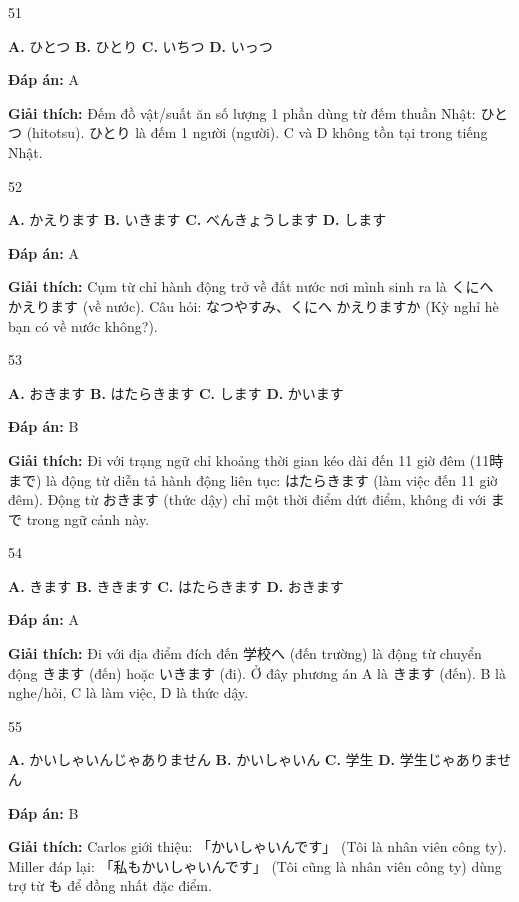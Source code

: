 \documentclass[12pt,a4paper]{report}
\newcommand{\source}[1]{}
\newcommand{\choice}[2]{\textbf{#1.} #2 \quad}
\newcommand{\answer}[1]{\par\textbf{Đáp án:} #1}
\newcommand{\confidence}[1]{}
\newcommand{\explain}[1]{\par\textbf{Giải thích:} #1\vspace{0.5cm}}
\begin{document}
\begin{question}{51}
\source{Q23.webp}
\choice{A}{ひとつ}
\choice{B}{ひとり}
\choice{C}{いちつ}
\choice{D}{いっつ}
\answer{A}
\confidence{high}
\explain{Đếm đồ vật/suất ăn số lượng 1 phần dùng từ đếm thuần Nhật: ひとつ (hitotsu). ひとり là đếm 1 người (người). C và D không tồn tại trong tiếng Nhật.}
\end{question}

\begin{question}{52}
\source{Q25.webp}
\choice{A}{かえります}
\choice{B}{いきます}
\choice{C}{べんきょうします}
\choice{D}{します}
\answer{A}
\confidence{high}
\explain{Cụm từ chỉ hành động trở về đất nước nơi mình sinh ra là くにへ かえります (về nước). Câu hỏi: なつやすみ、くにへ かえりますか (Kỳ nghỉ hè bạn có về nước không?).}
\end{question}

\begin{question}{53}
\source{Q26.webp}
\choice{A}{おきます}
\choice{B}{はたらきます}
\choice{C}{します}
\choice{D}{かいます}
\answer{B}
\confidence{high}
\explain{Đi với trạng ngữ chỉ khoảng thời gian kéo dài đến 11 giờ đêm (11時まで) là động từ diễn tả hành động liên tục: はたらきます (làm việc đến 11 giờ đêm). Động từ おきます (thức dậy) chỉ một thời điểm dứt điểm, không đi với まで trong ngữ cảnh này.}
\end{question}

\begin{question}{54}
\source{Q27.webp}
\choice{A}{きます}
\choice{B}{ききます}
\choice{C}{はたらきます}
\choice{D}{おきます}
\answer{A}
\confidence{high}
\explain{Đi với địa điểm đích đến 学校へ (đến trường) là động từ chuyển động きます (đến) hoặc いきます (đi). Ở đây phương án A là きます (đến). B là nghe/hỏi, C là làm việc, D là thức dậy.}
\end{question}

\begin{question}{55}
\source{Q28.webp}
\choice{A}{かいしゃいんじゃありません}
\choice{B}{かいしゃいん}
\choice{C}{学生}
\choice{D}{学生じゃありません}
\answer{B}
\confidence{high}
\explain{Carlos giới thiệu: 「かいしゃいんです」 (Tôi là nhân viên công ty). Miller đáp lại: 「私もかいしゃいんです」 (Tôi cũng là nhân viên công ty) dùng trợ từ も để đồng nhất đặc điểm.}
\end{question}
\end{document}
